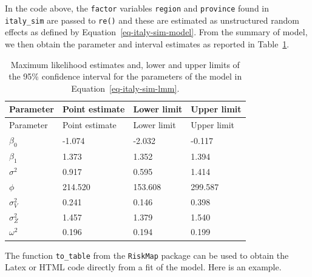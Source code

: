 \documentclass[
  letterpaper,
]{krantz}
\begin{document}
In the code above, the \texttt{factor} variables \texttt{region} and
\texttt{province} found in \texttt{italy\_sim} are passed to
\texttt{re()} and these are estimated as unstructured random effects as
defined by Equation~\ref{eq-italy-sim-model}. From the summary of model,
we then obtain the parameter and interval estimates as reported in
Table~\ref{tbl-italy-sim-mle}.

\begin{longtable}[]{@{}llll@{}}
\caption{Maximum likelihood estimates and, lower and upper limits of the
95\% confidence interval for the parameters of the model in
Equation~\ref{eq-italy-sim-lmm}.}\label{tbl-italy-sim-mle}\tabularnewline
\toprule\noalign{}
Parameter & Point estimate & Lower limit & Upper limit \\
\midrule\noalign{}
\endfirsthead
\toprule\noalign{}
Parameter & Point estimate & Lower limit & Upper limit \\
\midrule\noalign{}
\endhead
\bottomrule\noalign{}
\endlastfoot
\(\beta_0\) & -1.074 & -2.032 & -0.117 \\
\(\beta_1\) & 1.373 & 1.352 & 1.394 \\
\(\sigma^2\) & 0.917 & 0.595 & 1.414 \\
\(\phi\) & 214.520 & 153.608 & 299.587 \\
\(\sigma^2_{V}\) & 0.241 & 0.146 & 0.398 \\
\(\sigma^2_{Z}\) & 1.457 & 1.379 & 1.540 \\
\(\omega^2\) & 0.196 & 0.194 & 0.199 \\
\end{longtable}

The function \texttt{to\_table} from the \texttt{RiskMap} package can be
used to obtain the Latex or HTML code directly from a fit of the model.
Here is an example.
\end{document}
